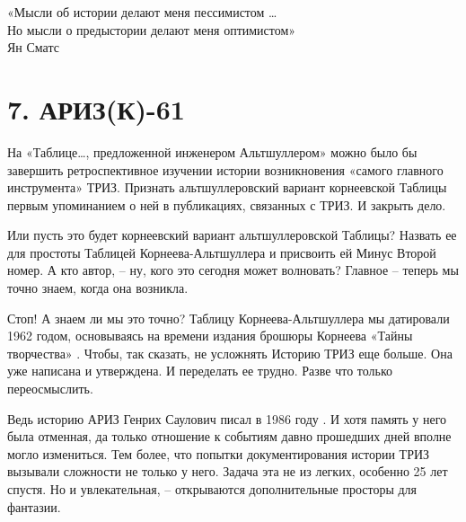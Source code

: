 \documentclass[11pt,a4paper]{article}
\begin{document}
\begin{flushright}
  «Мысли об истории делают меня пессимистом …\\
  Но мысли о предыстории делают меня оптимистом»\\
  Ян Сматс
\end{flushright}
\section*{7. АРИЗ(К)-61}

На «Таблице…, предложенной инженером Альтшуллером» можно было бы завершить
ретроспективное изучении истории возникновения «самого главного инструмента»
ТРИЗ. Признать альтшуллеровский вариант корнеевской Таблицы первым упоминанием
о ней в публикациях, связанных с ТРИЗ. И закрыть дело.

Или пусть это будет корнеевский вариант альтшуллеровской Таблицы? Назвать ее
для простоты Таблицей Корнеева-Альтшуллера и присвоить ей Минус Второй номер.
А кто автор, -- ну, кого это сегодня может волновать? Главное -- теперь мы
точно знаем, когда она возникла.

Стоп! А знаем ли мы это точно? Таблицу Корнеева-Альтшуллера мы датировали 1962
годом, основываясь на времени издания брошюры Корнеева «Тайны творчества»
\cite{Korneev1962}. Чтобы, так сказать, не усложнять Историю ТРИЗ еще больше.
Она уже написана и утверждена. И переделать ее трудно. Разве что только
переосмыслить.

Ведь историю АРИЗ Генрих Саулович писал в 1986 году \cite{Altshuller1986a}.  И
хотя память у него была отменная, да только отношение к событиям давно
прошедших дней вполне могло измениться. Тем более, что попытки
документирования истории ТРИЗ вызывали сложности не только у него. Задача эта
не из легких, особенно 25 лет спустя. Но и увлекательная, -- открываются
дополнительные просторы для фантазии.
\end{document}
